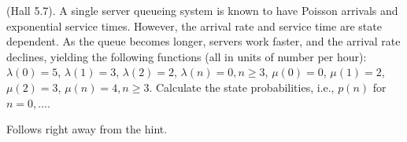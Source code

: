 \begin{question}
  (Hall 5.7). A single server queueing system is known to have Poisson
  arrivals and exponential service times. However, the arrival rate
  and service time are state dependent. As the queue becomes longer,
  servers work faster, and the arrival rate declines, yielding the
  following functions (all in units of number per hour):
  $\lambda(0) = 5$, $\lambda(1)=3$, $\lambda(2)=2$,
  $\lambda(n)=0, n\geq 3$, $\mu(0) = 0$, $\mu(1)=2$, $\mu(2)=3$, $\mu(n)=4, n\geq 3$. 
Calculate the state probabilities, i.e., $p(n)$ for $n=0,\ldots$. 
    \begin{solution}
      Follows right away from the hint.
    \end{solution}
\end{question}

